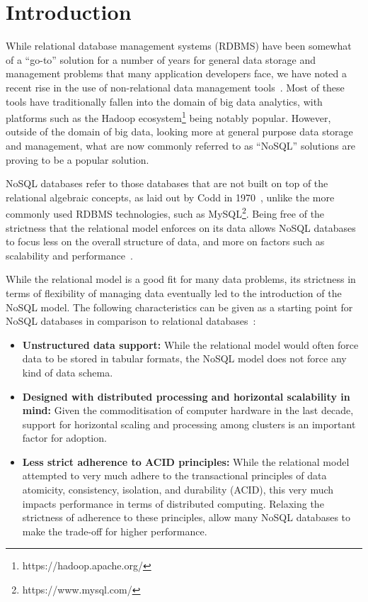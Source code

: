 \documentclass[a4paper,11pt]{article}
\begin{document}

\newpage
{}
\tableofcontents
\newpage



\section{Introduction} %
\label{sec:introduction}

While relational database management systems (RDBMS) have been somewhat of a ``go-to'' solution for a number of years
for general data storage and management problems that many application developers face, we have noted a recent rise
in the use of non-relational data management tools~\cite{padhy2011rdbms}. Most of these tools have traditionally fallen into the domain of
big data analytics, with platforms such as the Hadoop ecosystem\footnote{https://hadoop.apache.org/} being notably popular.
However, outside of the domain of big data, looking more at general purpose data storage and management, what are now
commonly referred to as ``NoSQL'' solutions are proving to be a popular solution.

NoSQL databases refer to those databases that are not built on top of the relational algebraic concepts, as laid out by
Codd in 1970~\cite{codd1970relational}, unlike the more commonly used RDBMS technologies, such as
MySQL\footnote{https://www.mysql.com/}. Being free of the strictness that the relational model enforces on its data allows
NoSQL databases to focus less on the overall structure of data, and more on factors such as scalability and
performance~\cite{leavitt2010will}.

While the relational model is a good fit for many data problems, its strictness in terms of flexibility of managing data
eventually led to the introduction of the NoSQL model. The following characteristics can be given as a starting point
for NoSQL databases in comparison to relational databases~\cite{indrawan2012database}:

\begin{itemize}
  \item \textbf{Unstructured data support:} While the relational model would often force data to be stored in tabular
  formats, the NoSQL model does not force any kind of data schema.
  \item \textbf{Designed with distributed processing and horizontal scalability in mind:} Given the commoditisation of
  computer hardware in the last decade, support for horizontal scaling and processing among clusters is an important
  factor for adoption.
  \item \textbf{Less strict adherence to ACID principles:} While the relational model attempted to very much adhere to
  the transactional principles of data atomicity, consistency, isolation, and durability (ACID), this very much impacts
  performance in terms of distributed computing. Relaxing the strictness of adherence to these principles, allow many
  NoSQL databases to make the trade-off for higher performance.
\end{itemize}
\end{document}
